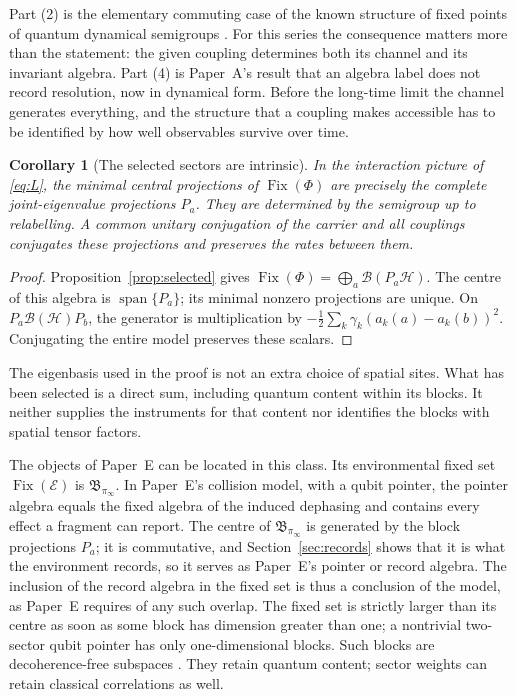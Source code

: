 \documentclass[12pt,a4paper]{article}
\newtheorem{corollary}[theorem]{Corollary}
\newcommand{\Hil}{\mathcal H}
\newcommand{\B}{\mathfrak B}
\begin{document}
Part (2) is the elementary commuting case of the known structure of fixed points of quantum dynamical semigroups \cite{Frigerio1978,BlumeKohout2010}. For this series the consequence matters more than the statement: the given coupling determines both its channel and its invariant algebra. Part (4) is Paper~A's result that an algebra label does not record resolution, now in dynamical form. Before the long-time limit the channel generates everything, and the structure that a coupling makes accessible has to be identified by how well observables survive over time.

\begin{corollary}[The selected sectors are intrinsic]
\label{cor:intrinsic-sectors}
In the interaction picture of \eqref{eq:L}, the minimal central
projections of $\operatorname{Fix}(\Phi)$ are precisely the complete
joint-eigenvalue projections $P_a$. They are determined by the
semigroup up to relabelling. A common unitary conjugation of the
carrier and all couplings conjugates these projections and preserves
the rates between them.
\end{corollary}
\begin{proof}
Proposition~\ref{prop:selected} gives
$\operatorname{Fix}(\Phi)=\bigoplus_a\mathcal B(P_a\Hil)$.
The centre of this algebra is $\operatorname{span}\{P_a\}$; its
minimal nonzero projections are unique. On
$P_a\mathcal B(\Hil)P_b$, the generator is multiplication by
$-\frac12\sum_k\gamma_k(a_k(a)-a_k(b))^2$.
Conjugating the entire model preserves these scalars.
\end{proof}

The eigenbasis used in the proof is not an extra choice of spatial
sites. What has been selected is a direct sum, including quantum
content within its blocks. It neither supplies the instruments for
that content nor identifies the blocks with spatial tensor factors.

The objects of Paper~E \cite{Liu2026PaperE} can be located in this class. Its environmental fixed set $\operatorname{Fix}(\mathcal E)$ is $\B_{\pi_\infty}$. In Paper~E's collision model, with a qubit pointer, the pointer algebra equals the fixed algebra of the induced dephasing and contains every effect a fragment can report. The centre of $\B_{\pi_\infty}$ is generated by the block projections $P_a$; it is commutative, and Section~\ref{sec:records} shows that it is what the environment records, so it serves as Paper~E's pointer or record algebra. The inclusion of the record algebra in the fixed set is thus a conclusion of the model, as Paper~E requires of any such overlap. The fixed set is strictly larger than its centre as soon as some block has dimension greater than one; a nontrivial two-sector qubit pointer has only one-dimensional blocks. Such blocks are decoherence-free subspaces \cite{ZanardiRasetti1997,KnillLaflammeViola2000}. They retain quantum content; sector weights can retain classical correlations as well.
\end{document}
